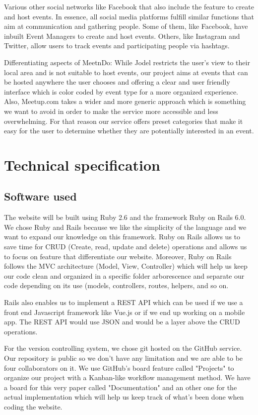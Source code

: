 \documentclass[conference]{IEEEtran}
\begin{document}
Various other social networks like Facebook that also include the feature to create and host events. 
In essence, all social media platforms fulfill similar functions that aim at communication and gathering people. 
Some of them, like Facebook, have inbuilt Event Managers to create and host events. 
Others, like Instagram and Twitter, allow users to track events and participating people via hashtags.

Differentiating aspects of MeetnDo: While Jodel restricts the user’s view to their local area and is not suitable to host events, our project aims at events that can be hosted anywhere the user chooses and offering a clear and user friendly interface which is color coded by event type for a more organized experience. 
Also, Meetup.com takes a wider and more generic approach which is something we want to avoid in order to make the service more accessible and less overwhelming. 
For that reason our service offers preset categories that make it easy for the user to determine whether they are potentially interested in an event.

\section{Technical specification}

\subsection{Software used}

The website will be built using Ruby 2.6 and the framework Ruby on Rails 6.0. We chose Ruby and Rails because we like the simplicity of the language and we want to expand our knowledge on this framework. 
Ruby on Rails allows us to save time for CRUD (Create, read, update and delete) operations and allows us to focus on feature that differentiate our website. 
Moreover, Ruby on Rails follows the MVC architecture (Model, View, Controller) which will help us keep our code clean and organized in a specific folder arborescence and separate our code depending on its use (models, controllers, routes, helpers, and so on.

Rails also enables us to implement a REST API which can be used if we use a front end Javascript framework like Vue.js or if we end up working on a mobile app. 
The REST API would use JSON and would be a layer above the CRUD operations.

For the version controlling system, we chose git hosted on the GitHub service. 
Our repository is public so we don't have any limitation and we are able to be four collaborators on it. 
We use GitHub's board feature called "Projects" to organize our project with a Kanban-like workflow management method. 
We have a board for this very paper called "Documentation" and an other one for the actual implementation which will help us keep track of what's been done when coding the website.
\end{document}
